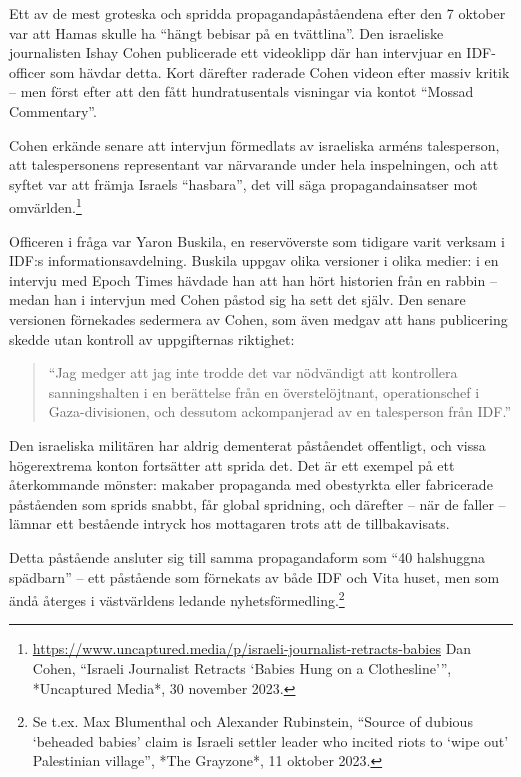 Ett av de mest groteska och spridda propagandapåståendena efter den 7 oktober var att Hamas skulle ha “hängt bebisar på en tvättlina”. Den israeliske journalisten Ishay Cohen publicerade ett videoklipp där han intervjuar en IDF-officer som hävdar detta. Kort därefter raderade Cohen videon efter massiv kritik – men först efter att den fått hundratusentals visningar via kontot “Mossad Commentary”.

Cohen erkände senare att intervjun förmedlats av israeliska arméns talesperson, att talespersonens representant var närvarande under hela inspelningen, och att syftet var att främja Israels “hasbara”, det vill säga propagandainsatser mot omvärlden.\footnote{\url{https://www.uncaptured.media/p/israeli-journalist-retracts-babies} Dan Cohen, “Israeli Journalist Retracts ‘Babies Hung on a Clothesline’”, *Uncaptured Media*, 30 november 2023.}

Officeren i fråga var Yaron Buskila, en reservöverste som tidigare varit verksam i IDF:s informationsavdelning. Buskila uppgav olika versioner i olika medier: i en intervju med Epoch Times hävdade han att han hört historien från en rabbin – medan han i intervjun med Cohen påstod sig ha sett det själv. Den senare versionen förnekades sedermera av Cohen, som även medgav att hans publicering skedde utan kontroll av uppgifternas riktighet: 

\begin{quote}
    “Jag medger att jag inte trodde det var nödvändigt att kontrollera sanningshalten i en berättelse från en överstelöjtnant, operationschef i Gaza-divisionen, och dessutom ackompanjerad av en talesperson från IDF.”
\end{quote}

Den israeliska militären har aldrig dementerat påståendet offentligt, och vissa högerextrema konton fortsätter att sprida det. Det är ett exempel på ett återkommande mönster: makaber propaganda med obestyrkta eller fabricerade påståenden som sprids snabbt, får global spridning, och därefter – när de faller – lämnar ett bestående intryck hos mottagaren trots att de tillbakavisats.

Detta påstående ansluter sig till samma propagandaform som “40 halshuggna spädbarn” – ett påstående som förnekats av både IDF och Vita huset, men som ändå återges i västvärldens ledande nyhetsförmedling.\footnote{Se t.ex. Max Blumenthal och Alexander Rubinstein, “Source of dubious ‘beheaded babies’ claim is Israeli settler leader who incited riots to ‘wipe out’ Palestinian village”, *The Grayzone*, 11 oktober 2023.}

